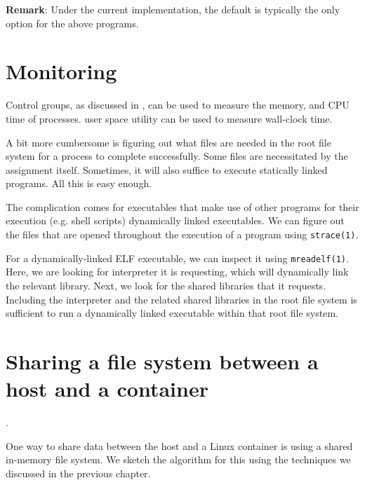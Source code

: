 \textbf{Remark}: Under the current implementation, the default is typically the
only option for the above programs.

\section{Monitoring}

Control groups, as discussed in , can
be used to measure the memory, and CPU time of processes. \cite{man-1-time}
user space utility can be used to measure wall-clock time.

A bit more cumbersome is figuring out what files are needed in the root file
system for a process to complete successfully. Some files are necessitated by
the assignment itself. Sometimes, it will also suffice to execute statically
linked programs. All this is easy enough.

The complication comes for executables that make use of other programs for
their execution (e.g. shell scripts) dynamically linked executables. We can
figure out the files that are opened throughout the execution of a program
using \texttt{strace(1)}.

For a dynamically-linked ELF executable, we can inspect it using
\texttt{mreadelf(1)}. Here, we are looking for interpreter it is requesting,
which will dynamically link the relevant library. Next, we look for the shared
libraries that it requests. Including the interpreter and the related shared
libraries in the root file system is sufficient to run a dynamically linked
executable within that root file system.

\section{Sharing a file system between a host and a container}.

One way to share data between the host and a Linux container is using a shared
in-memory file system. We sketch the algorithm for this using the techniques we
discussed in the previous chapter.

